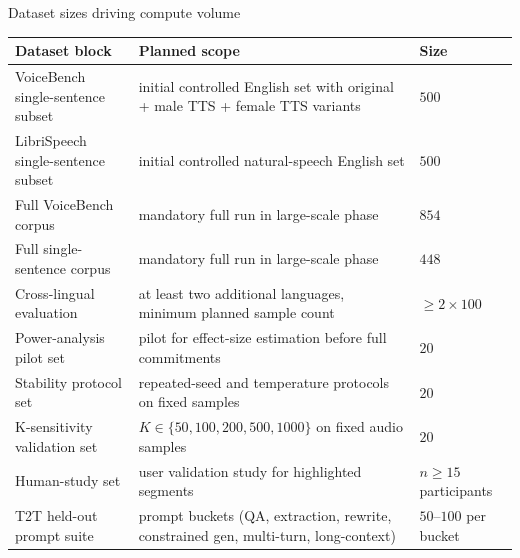 \documentclass[aspectratio=169]{beamer}
\begin{document}
\begin{frame}{Dataset sizes driving compute volume}
  \scriptsize
  \begin{tabularx}{\textwidth}{>{\raggedright\arraybackslash}p{3.3cm} >{\raggedright\arraybackslash}X >{\raggedright\arraybackslash}p{2.0cm}}
    \toprule
    \textbf{Dataset block} & \textbf{Planned scope} & \textbf{Size} \\
    \midrule
    VoiceBench single-sentence subset & initial controlled English set with original + male TTS + female TTS variants & \(500\) \\
    LibriSpeech single-sentence subset & initial controlled natural-speech English set & \(500\) \\
    Full VoiceBench corpus & mandatory full run in large-scale phase & \(854\) \\
    Full single-sentence corpus & mandatory full run in large-scale phase & \(448\) \\
    Cross-lingual evaluation & at least two additional languages, minimum planned sample count & \(\ge 2 \times 100\) \\
    Power-analysis pilot set & pilot for effect-size estimation before full commitments & \(20\) \\
    Stability protocol set & repeated-seed and temperature protocols on fixed samples & \(20\) \\
    K-sensitivity validation set & \(K \in \{50,100,200,500,1000\}\) on fixed audio samples & \(20\) \\
    Human-study set & user validation study for highlighted segments & \(n \ge 15\) participants \\
    T2T held-out prompt suite & 6 prompt buckets (QA, extraction, rewrite, constrained gen, multi-turn, long-context) & \(50\)--\(100\) per bucket \\
    \bottomrule
  \end{tabularx}
\end{frame}
\end{document}
